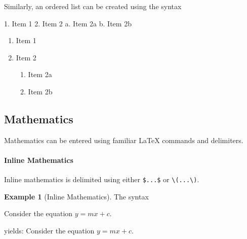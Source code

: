 \documentclass[
]{article}
\newenvironment{Shaded}{\begin{snugshade}}{\end{snugshade}}
\newcommand{\NormalTok}[1]{#1}
\newcommand{\SpecialStringTok}[1]{\textcolor[rgb]{0.31,0.60,0.02}{#1}}
\providecommand{\tightlist}{%
  \setlength{\itemsep}{0pt}\setlength{\parskip}{0pt}}
\numberwithin{equation}{section}
\numberwithin{figure}{section}
\theoremstyle{break}
\theoremstyle{definition}
\theoremstyle{definition}
\newtheorem{example}{Example}[section]
\theoremstyle{definition}
\theoremstyle{definition}
\theoremstyle{remark}
\begin{document}
Similarly, an ordered list can be created using the syntax

\begin{Shaded}
\begin{Highlighting}[]
\SpecialStringTok{1. }\NormalTok{Item 1}
\SpecialStringTok{2. }\NormalTok{Item 2}
\NormalTok{    a. Item 2a}
\NormalTok{    b. Item 2b}
\end{Highlighting}
\end{Shaded}

\begin{enumerate}
\def\labelenumi{\arabic{enumi}.}
\tightlist
\item
  Item 1
\item
  Item 2

  \begin{enumerate}
  \def\labelenumii{\alph{enumii}.}
  \tightlist
  \item
    Item 2a
  \item
    Item 2b
  \end{enumerate}
\end{enumerate}

\hypertarget{mathematics}{%
\subsection{Mathematics}\label{mathematics}}

Mathematics can be entered using familiar LaTeX commands and delimiters.

\hypertarget{inline-mathematics}{%
\paragraph*{Inline Mathematics}\label{inline-mathematics}}

Inline mathematics is delimited using either \texttt{\$...\$} or \texttt{\textbackslash{}(...\textbackslash{})}.

\begin{example}[Inline Mathematics]
The syntax

\begin{Shaded}
\begin{Highlighting}[]
\NormalTok{Consider the equation $y = mx+c$.}
\end{Highlighting}
\end{Shaded}

yields: Consider the equation \(y = mx+c\).
\end{example}
\end{document}
